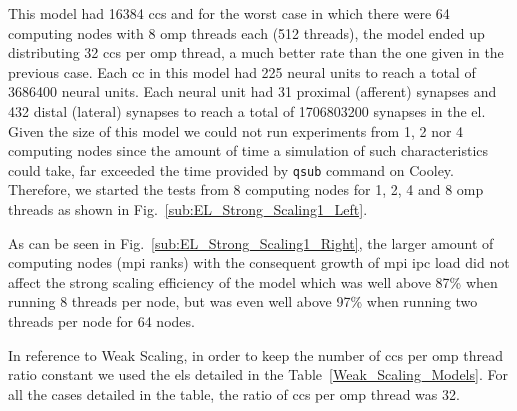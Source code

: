 {This model had 16384 \glspl{cc} and for the worst case in which there were 64 computing nodes with 8 \gls{omp} threads each (512 threads), the model ended up distributing 32 \glspl{cc} per \gls{omp} thread, a much better rate than the one given in the previous case. Each \gls{cc} in this model had 225 neural units to reach a total of 3686400 neural units. Each neural unit had 31 proximal (afferent) synapses and 432 distal (lateral) synapses to reach a total of 1706803200 synapses in the \gls{el}. Given the size of this model we could not run experiments from 1, 2 nor 4 computing nodes since the amount of time a simulation of such characteristics could take, far exceeded the time provided by \texttt{qsub} command on Cooley. Therefore, we started the tests from 8 computing nodes for 1, 2, 4 and 8 \gls{omp} threads as shown in Fig.~\ref{sub:EL_Strong_Scaling1_Left}.

As can be seen in Fig.~\ref{sub:EL_Strong_Scaling1_Right}, the larger amount of computing nodes (\gls{mpi} ranks) with the consequent growth of \gls{mpi} \gls{ipc} load did not affect the strong scaling efficiency of the model which was well above 87\% when running 8 threads per node, but was even well above 97\% when running two threads per node for 64 nodes.

In reference to Weak Scaling, in order to keep the number of \glspl{cc} per \gls{omp} thread ratio constant we used the \glspl{el} detailed in the Table~\ref{Weak_Scaling_Models}. For all the cases detailed in the table, the ratio of \glspl{cc} per \gls{omp} thread was 32.

}
